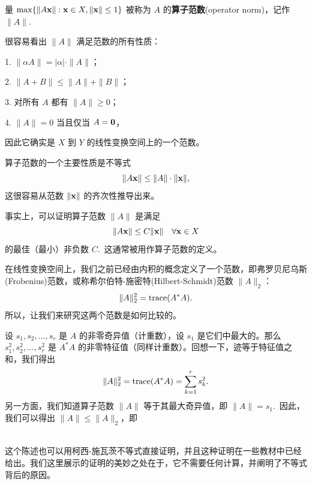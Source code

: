 

\begin{definition*}
量 $\max\{\|A\mathbf{x}\| : \mathbf{x} \in X, \|\mathbf{x}\| \le 1\}$ 被称为 $A$ 的\textbf{算子范数}(operator norm)，记作 $\|A\|$.~
\end{definition*}

很容易看出 $\|A\|$ 满足范数的所有性质：

1. $\|\alpha A\| = |\alpha| \cdot \|A\|$；

2. $\|A + B\| \le \|A\| + \|B\|$；

3. 对所有 $A$ 都有 $\|A\| \ge 0$；

4. $\|A\| = 0$ 当且仅当 $A = \mathbf{0}$，

因此它确实是 $X$ 到 $Y$ 的线性变换空间上的一个范数。

算子范数的一个主要性质是不等式
$$\|A\mathbf{x}\| \le \|A\| \cdot \|\mathbf{x}\|,$$
这很容易从范数 $\|\mathbf{x}\|$ 的齐次性推导出来。

事实上，可以证明算子范数 $\|A\|$ 是满足
$$\|A\mathbf{x}\| \le C \|\mathbf{x}\| \quad \forall \mathbf{x} \in X$$
的最佳（最小）非负数 $C$.~这通常被用作算子范数的定义。

在线性变换空间上，我们之前已经由内积的概念定义了一个范数，即弗罗贝尼乌斯(Frobenius)范数，或称希尔伯特-施密特(Hilbert-Schmidt)范数 $\|A\|_2$：$$\|A\|_2^2 = \operatorname{trace}(A^*A).$$
所以，让我们来研究这两个范数是如何比较的。

设 $s_1, s_2, \dots, s_r$ 是 $A$ 的非零奇异值（计重数），设 $s_1$ 是它们中最大的。那么 $s_1^2, s_2^2, \dots, s_r^2$ 是 $A^*A$ 的非零特征值（同样计重数）。回想一下，迹等于特征值之和，我们得出
$$\|A\|_2^2 = \operatorname{trace}(A^*A) = \sum_{k=1}^r s_k^2.$$
另一方面，我们知道算子范数 $\|A\|$ 等于其最大奇异值，即 $\|A\| = s_1$.~因此，我们可以得出 $\|A\| \le \|A\|_2$，即

\\
这个陈述也可以用柯西-施瓦茨不等式直接证明，并且这种证明在一些教材中已经给出。我们这里展示的证明的美妙之处在于，它不需要任何计算，并阐明了不等式背后的原因。

